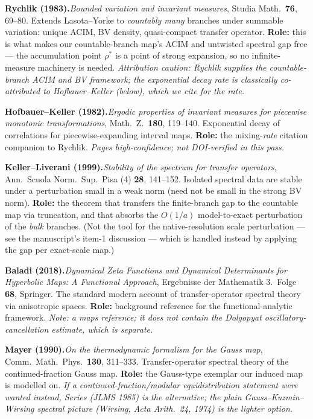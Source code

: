 \documentclass[11pt]{article}
\newcommand{\entry}[2]{\medskip\noindent\textbf{#1}\quad #2\par}
\begin{document}
\entry{Rychlik (1983).}{\emph{Bounded variation and invariant measures}, Studia
Math.\ \textbf{76}, 69--80. Extends Lasota--Yorke to \emph{countably many}
branches under summable variation: unique ACIM, BV density, quasi-compact
transfer operator. \textbf{Role:} this is what makes our countable-branch map's
ACIM and untwisted spectral gap free --- the accumulation point $\rho^\ast$ is a
point of strong expansion, so no infinite-measure machinery is needed.
\emph{Attribution caution: Rychlik supplies the countable-branch ACIM and BV
framework; the exponential decay \emph{rate} is classically co-attributed to
Hofbauer--Keller (below), which we cite for the rate.}}

\entry{Hofbauer--Keller (1982).}{\emph{Ergodic properties of invariant measures
for piecewise monotonic transformations}, Math.\ Z.\ \textbf{180}, 119--140.
Exponential decay of correlations for piecewise-expanding interval maps.
\textbf{Role:} the mixing-\emph{rate} citation companion to Rychlik.
\emph{Pages high-confidence; not DOI-verified in this pass.}}

\entry{Keller--Liverani (1999).}{\emph{Stability of the spectrum for transfer
operators}, Ann.\ Scuola Norm.\ Sup.\ Pisa (4) \textbf{28}, 141--152. Isolated
spectral data are stable under a perturbation small in a weak norm (need not be
small in the strong BV norm). \textbf{Role:} the theorem that transfers the
finite-branch gap to the countable map via truncation, and that absorbs the
$O(1/a)$ model-to-exact perturbation of the \emph{bulk} branches. (Not the tool
for the native-resolution scale perturbation --- see the manuscript's item-1
discussion --- which is handled instead by applying the gap per exact-scale
map.)}

\entry{Baladi (2018).}{\emph{Dynamical Zeta Functions and Dynamical Determinants
for Hyperbolic Maps: A Functional Approach}, Ergebnisse der Mathematik 3.\ Folge
\textbf{68}, Springer. The standard modern account of transfer-operator spectral
theory via anisotropic spaces. \textbf{Role:} background reference for the
functional-analytic framework. \emph{Note: a \emph{maps} reference; it does not
contain the Dolgopyat oscillatory-cancellation estimate, which is separate.}}

\entry{Mayer (1990).}{\emph{On the thermodynamic formalism for the Gauss map},
Comm.\ Math.\ Phys.\ \textbf{130}, 311--333. Transfer-operator spectral theory
of the continued-fraction Gauss map. \textbf{Role:} the Gauss-type exemplar our
induced map is modelled on. \emph{If a continued-fraction/modular equidistribution
statement were wanted instead, Series (JLMS 1985) is the alternative; the plain
Gauss--Kuzmin--Wirsing spectral picture (Wirsing, Acta Arith.\ 24, 1974) is the
lighter option.}}
\end{document}
